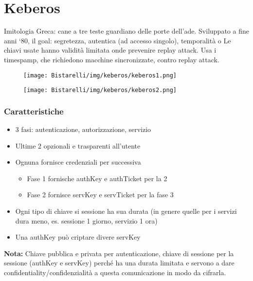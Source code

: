 \chapter*{Keberos}
Imitologia Greca: cane a tre teste guardiano delle porte dell’ade. Sviluppato a fine anni ‘80, il goal: segretezza, autentica (ad accesso singolo), temporalità o Le chiavi usate hanno validità limitata onde prevenire replay attack. Usa i timespamp, che richiedono macchine sincronizzate, contro replay attack. 

\begin{figure}[H]
	\centering
    \texttt{[image: Bistarelli/img/keberos/keberos1.png]}
\end{figure}

\begin{figure}[H]
	\centering
    \texttt{[image: Bistarelli/img/keberos/keberos2.png]}
\end{figure}

\subsection{Caratteristiche}
\begin{itemize}
    \item 3 fasi: autenticazione, autorizzazione, servizio
    
    \item Ultime 2 opzionali e trasparenti all’utente
    
    \item Ognuna fornisce credenziali per successiva
    
    \begin{itemize}
        \item Fase 1 fornische authKey e authTicket per la 2
        
        \item Fase 2 fornisce servKey e servTicket per la fase 3
    \end{itemize}
    
    \item Ogni tipo di chiave si sessione ha sua durata (in genere quelle per i servizi dura meno, es. sessione 1 giorno, servizio 1 ora)
    
    \item Una authKey può criptare divere servKey
    
\end{itemize}
\textbf{Nota:} Chiave pubblica e privata per autenticazione, chiave di sessione per la sessione (authKey e servKey)
perché ha una durata limitata e servono a dare confidentiality/confidenzialità a questa comunicazione in modo da
cifrarla.

